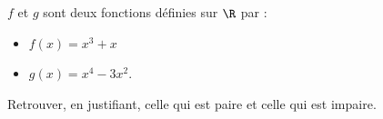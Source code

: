 \begin{exo}{}
	$f$ et $g$ sont deux fonctions définies sur $\R$ par :

	\begin{itemize}
		\item $f(x) = x^3 + x$
		\item $g(x) = x^4 - 3x^2$.
	\end{itemize}

	Retrouver, en justifiant, celle qui est paire et celle qui est impaire.
\end{exo}
